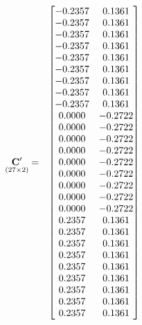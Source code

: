 \documentclass{glimmpse-report}
\begin{document}
\begin{eqnarray*}
\underset{\left(27\times2\right)}{\mathbf{C}'} & = & \begin{bmatrix}-0.2357 & 0.1361\protect\\
-0.2357 & 0.1361\protect\\
-0.2357 & 0.1361\protect\\
-0.2357 & 0.1361\protect\\
-0.2357 & 0.1361\protect\\
-0.2357 & 0.1361\protect\\
-0.2357 & 0.1361\protect\\
-0.2357 & 0.1361\protect\\
-0.2357 & 0.1361\protect\\
0.0000 & -0.2722\protect\\
0.0000 & -0.2722\protect\\
0.0000 & -0.2722\protect\\
0.0000 & -0.2722\protect\\
0.0000 & -0.2722\protect\\
0.0000 & -0.2722\protect\\
0.0000 & -0.2722\protect\\
0.0000 & -0.2722\protect\\
0.0000 & -0.2722\protect\\
0.2357 & 0.1361\protect\\
0.2357 & 0.1361\protect\\
0.2357 & 0.1361\protect\\
0.2357 & 0.1361\protect\\
0.2357 & 0.1361\protect\\
0.2357 & 0.1361\protect\\
0.2357 & 0.1361\protect\\
0.2357 & 0.1361\protect\\
0.2357 & 0.1361\protect\\
\end{bmatrix}
\end{eqnarray*}
\end{document}
